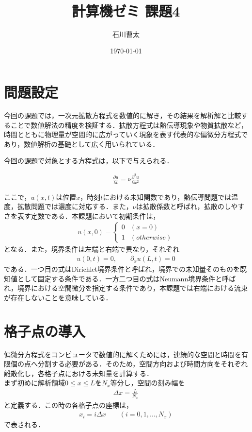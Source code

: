 \documentclass[dvipdfmx]{jsarticle}
\title{計算機ゼミ 課題4}
\author{石川曹太}
\date{\today}
\begin{document}
\maketitle

\section{問題設定}
今回の課題では，一次元拡散方程式を数値的に解き，その結果を解析解と比較することで数値解法の精度を検証する．拡散方程式は熱伝導現象や物質拡散など，時間とともに物理量が空間的に広がっていく現象を表す代表的な偏微分方程式であり，数値解析の基礎として広く用いられている．

今回の課題で対象とする方程式は，以下で与えられる．

\begin{align}
  \frac{\partial u}{\partial t} = \nu \frac{\partial^2 u}{\partial x^2}
\end{align}

ここで，$u(x,t)$は位置$x$，時刻$t$における未知関数であり，熱伝導問題では温度，拡散問題では濃度に対応する．また，$\nu$は拡散係数と呼ばれ，拡散のしやすさを表す定数である．本課題において初期条件は，
\begin{align}
  u(x,0)=
  \begin{cases}
    0 & (x=0)\\
    1 & (otherwise)
  \end{cases}
\end{align}
となる．また，境界条件は左端と右端で異なり，それぞれ
\begin{align}
  u(0,t) = 0 ,\qquad \partial_xu(L,t) = 0
\end{align}
である．一つ目の式はDirichlet境界条件と呼ばれ，境界での未知量そのものを既知値として固定する条件である．一方二つ目の式はNeumann境界条件と呼ばれ，境界における空間微分を指定する条件であり，本課題では右端における流束が存在しないことを意味している．\\

\section{格子点の導入}
偏微分方程式をコンピュータで数値的に解くためには，連続的な空間と時間を有限個の点へ分割する必要がある．そのため，空間方向および時間方向をそれぞれ離散化し，各格子点における未知量を計算する．\\

まず初めに解析領域$0\le x\le L$を$N_x$等分し，空間の刻み幅を
\begin{align}
  \Delta x = \frac{L}{N_x}
\end{align}
と定義する．この時の各格子点の座標は，
\begin{align}
  x_i = i \Delta x \qquad (i = 0,1,\dots,N_x)
\end{align}
で表される．\\
\end{document}
